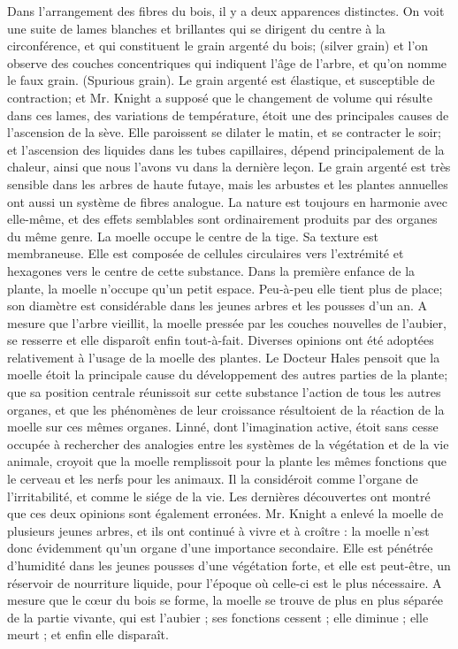 Dans l'arrangement des fibres du bois, il y a deux apparences distinctes. On voit une suite de lames blanches et brillantes qui se dirigent du centre à la circonférence, et qui constituent le grain argenté du bois; (silver grain) et l'on observe des couches concentriques qui indiquent l'âge de l'arbre, et qu'on nomme le faux grain. (Spurious grain).
Le grain argenté est élastique, et susceptible de contraction; et Mr. Knight a supposé que le changement de volume qui résulte dans ces lames, des variations de température, étoit une des principales causes de l'ascension de la sève. Elle paroissent se\setcounter{page}{380} dilater le matin, et se contracter le soir; et l'ascension des liquides dans les tubes capillaires, dépend principalement de la chaleur, ainsi que nous l'avons vu dans la dernière leçon.
Le grain argenté est très sensible dans les arbres de haute futaye, mais les arbustes et les plantes annuelles ont aussi un système de fibres analogue. La nature est toujours en harmonie avec elle-même, et des effets semblables sont ordinairement produits par des organes du même genre.
La moelle occupe le centre de la tige. Sa texture est membraneuse. Elle est composée de cellules circulaires vers l'extrémité et hexagones vers le centre de cette substance.
Dans la première enfance de la plante, la moelle n'occupe qu'un petit espace. Peu-à-peu elle tient plus de place; son diamètre est considérable dans les jeunes arbres et les pousses d'un an. A mesure que l'arbre vieillit, la moelle pressée par les couches nouvelles de l'aubier, se resserre et elle disparoît enfin tout-à-fait.
Diverses opinions ont été adoptées relativement à l'usage de la moelle des plantes. Le Docteur Hales pensoit que la moelle étoit la principale cause du développement des autres parties de la plante; que sa position\setcounter{page}{381} centrale réunissoit sur cette substance l'action de tous les autres organes, et que les phénomènes de leur croissance résultoient de la réaction de la moelle sur ces mêmes organes.
Linné, dont l'imagination active, étoit sans cesse occupée à rechercher des analogies entre les systèmes de la végétation et de la vie animale, croyoit que la moelle remplissoit pour la plante les mêmes fonctions que le cerveau et les nerfs pour les animaux. Il la considéroit comme l'organe de l'irritabilité, et comme le siége de la vie.
Les dernières découvertes ont montré que ces deux opinions sont également erronées. Mr. Knight a enlevé la moelle de plusieurs jeunes arbres, et ils ont continué à vivre et à croître : la moelle n'est donc évidemment qu'un organe d'une importance secondaire. Elle est pénétrée d'humidité dans les jeunes pousses d'une végétation forte, et elle est peut-être, un réservoir de nourriture liquide, pour l'époque où celle-ci est le plus nécessaire. A mesure que le cœur du bois se forme, la moelle se trouve de plus en plus séparée de la partie vivante, qui est l'aubier ; ses fonctions cessent ; elle diminue ; elle meurt ; et enfin elle disparaît.
